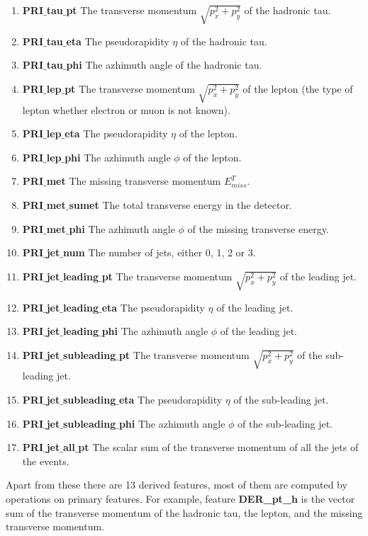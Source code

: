 \documentclass[final,3p,times,twocolumn]{elsarticle}
\begin{document}
\begin{enumerate}[noitemsep]
\item{\textbf{PRI$\_$tau$\_$pt} The transverse momentum $\sqrt{p_{x}^2 + p_{y}^2}$ of the hadronic tau.}
\item{\textbf{PRI$\_$tau$\_$eta} The pseudorapidity $\eta$ of the hadronic tau.}
\item{\textbf{PRI$\_$tau$\_$phi} The azhimuth angle of the hadronic tau.}
\item{\textbf{PRI$\_$lep$\_$pt} The transverse momentum $\sqrt{p_{x}^2 + p_{y}^2}$ of the lepton (the type of lepton whether electron or muon is not known).}
\item{\textbf{PRI$\_$lep$\_$eta} The pseudorapidity $\eta$ of the lepton.}
\item{\textbf{PRI$\_$lep$\_$phi} The azhimuth angle $\phi$ of the lepton.}
\item{\textbf{PRI$\_$met} The missing transverse momentum $E_{miss}^{T}$.}
\item{\textbf{PRI$\_$met$\_$sumet} The total transverse energy in the detector.}
\item{\textbf{PRI$\_$met$\_$phi} The azhimuth angle $\phi$ of the missing transverse energy.}
\item{\textbf{PRI$\_$jet$\_$num} The number of jets, either 0, 1, 2 or 3.}
\item{\textbf{PRI$\_$jet$\_$leading$\_$pt} The transverse momentum $\sqrt{p_{x}^2 + p_{y}^2}$ of the leading jet.}
\item{\textbf{PRI$\_$jet$\_$leading$\_$eta} The pseudorapidity $\eta$ of the leading jet.}
\item{\textbf{PRI$\_$jet$\_$leading$\_$phi} The azhimuth angle $\phi$ of the leading jet.}
\item{\textbf{PRI$\_$jet$\_$subleading$\_$pt} The transverse momentum $\sqrt{p_{x}^2 + p_{y}^2}$ of the sub-leading jet.}
\item{\textbf{PRI$\_$jet$\_$subleading$\_$eta} The pseudorapidity $\eta$ of the sub-leading jet.}
\item{\textbf{PRI$\_$jet$\_$subleading$\_$phi} The azhimuth angle $\phi$ of the sub-leading jet.}
\item{\textbf{PRI$\_$jet$\_$all$\_$pt} The scalar sum of the transverse momentum of all the jets of the events.}
\end{enumerate}

Apart from these there are 13 derived features, most of them are computed by operations on primary features. For example, feature \textbf{DER\_pt\_h} is the vector sum of the transverse momentum of the hadronic tau, the lepton, and the missing transverse momentum. 
\end{document}
